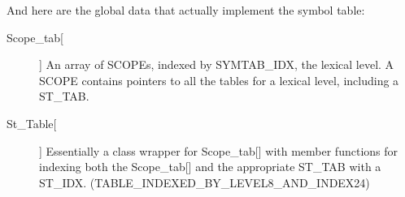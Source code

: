 And here are the global data that actually implement the symbol
table:

\begin{description}

  \item [Scope\_tab[]] An array of SCOPEs, indexed by SYMTAB\_IDX,
  the lexical level.  A SCOPE contains pointers to all the tables
  for a lexical level, including a ST\_TAB.

  \item [St\_Table[]] Essentially a class wrapper for Scope\_tab[]
  with member functions for indexing both the Scope\_tab[] and the
  appropriate ST\_TAB with a ST\_IDX. 
  (TABLE\_INDEXED\_BY\_LEVEL8\_AND\_INDEX24)

\end{description}



%
